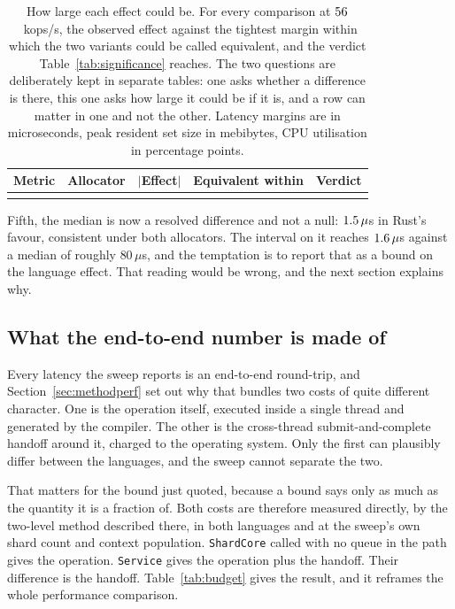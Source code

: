 \documentclass[english,oneside,a4paper,censored,csm,software-track-2020]{HYthesisML}
\begin{document}
\begin{table}[H]
\centering
\small
\caption[How large each effect could be, for the comparisons the tests do not resolve]{How large each effect could be. For every comparison at $56$~kops/s, the
observed effect against the tightest margin within which the two variants could be called
equivalent, and the verdict Table~\ref{tab:significance} reaches. The two questions are
deliberately kept in separate tables: one asks whether a difference is there, this one asks how
large it could be if it is, and a row can matter in one and not the other. Latency margins are
in microseconds, peak resident set size in mebibytes, CPU utilisation in percentage
points.\label{tab:equivalence}}
\begin{tabular}{@{}l l r r l@{}}
\hline\hline
Metric & Allocator & $|$Effect$|$ & Equivalent within & Verdict \\
\hline
\\
\hline
\end{tabular}
\end{table}

Fifth, the median is now a resolved difference and not a null: $1.5\,\mu$s
in Rust's favour, consistent under both allocators. The interval on it reaches
$1.6\,\mu$s against a median of roughly $80\,\mu$s, and the temptation is to report
that as a bound on the language effect. That reading would be wrong, and the next section
explains why.

\subsection{What the end-to-end number is made of}\label{sec:budget}
Every latency the sweep reports is an end-to-end round-trip, and
Section~\ref{sec:methodperf} set out why that bundles two costs of quite different character.
One is the operation itself, executed inside a single thread and generated by the compiler. The
other is the cross-thread submit-and-complete handoff around it, charged to the operating system.
Only the first can plausibly differ between the languages, and the sweep cannot separate the two.

That matters for the bound just quoted, because a bound says only as much as the quantity
it is a fraction of. Both costs are therefore measured directly, by the two-level method described
there, in both languages and at the sweep's own shard count and context population.
\texttt{ShardCore} called with no queue in the path gives the operation. \texttt{Service} gives
the operation plus the handoff. Their difference is the handoff.
Table~\ref{tab:budget} gives the result, and it reframes the whole performance comparison.
\end{document}
